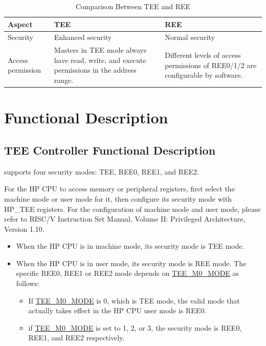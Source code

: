 \documentclass[main\_\_EN.tex]{subfiles}
\begin{document}
\begin{longtable}{|L{3cm}|L{6cm}|L{7cm}|}
    \caption{Comparison Between TEE and REE}
    \label{tab:tee-ree-comparison}\\
\hline{}
\textbf{Aspect} & \textbf{TEE} & \textbf{REE} \\
\hline
Security & Enhanced security & Normal security \\
\hline
Access permission &  Masters in TEE mode always have read, write, and execute permissions in the address range. & Different levels of access permissions of REE0/1/2 are configurable by software.\\
\hline
\end{longtable}

\section{Functional Description}

\subsection{TEE Controller Functional Description}

\chipname{} supports four security modes: TEE, REE0, REE1, and REE2.

For the HP CPU to access memory or peripheral registers, first select the machine mode or user mode for it, then configure its security mode with HP\_TEE registers. For the configuration of machine mode and user mode, please refer to RISC\-/V Instruction Set Manual, Volume II: Privileged Architecture, Version 1.10.

\begin{itemize}
    \item When the HP CPU is in machine mode, its security mode is TEE mode.
    \item When the HP CPU is in user mode, its security mode is REE mode. The specific REE0, REE1 or REE2 mode depends on \hyperref[fielddesc:TEEMNMODE]{TEE\_M0\_MODE} as follows:
    \begin{itemize}
        \item If \hyperref[fielddesc:TEEMNMODE]{TEE\_M0\_MODE} is 0, which is TEE mode, the valid mode that actually takes effect in the HP CPU user mode is REE0.
        \item if \hyperref[fielddesc:TEEMNMODE]{TEE\_M0\_MODE} is set to 1, 2, or 3, the security mode is REE0, REE1, and REE2 respectively.
    \end{itemize}
\end{itemize}
\end{document}
